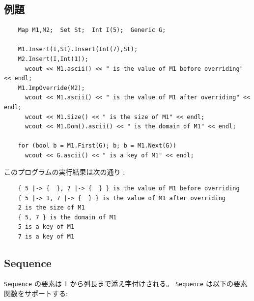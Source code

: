 \documentclass[\pformat,12pt]{jarticle}
\begin{document}
\subsection*{例題}

\begin{verbatim}
    Map M1,M2;  Set St;  Int I(5);  Generic G;

    M1.Insert(I,St).Insert(Int(7),St);
    M2.Insert(I,Int(1));
      wcout << M1.ascii() << " is the value of M1 before overriding" << endl;
    M1.ImpOverride(M2);        
      wcout << M1.ascii() << " is the value of M1 after overriding" << endl;
      wcout << M1.Size() << " is the size of M1" << endl;
      wcout << M1.Dom().ascii() << " is the domain of M1" << endl;
    
    for (bool b = M1.First(G); b; b = M1.Next(G))
      wcout << G.ascii() << " is a key of M1" << endl;
\end{verbatim}

\noindent このプログラムの実行結果は次の通り :

\begin{verbatim}
    { 5 |-> {  }, 7 |-> {  } } is the value of M1 before overriding
    { 5 |-> 1, 7 |-> {  } } is the value of M1 after overriding
    2 is the size of M1
    { 5, 7 } is the domain of M1
    5 is a key of M1
    7 is a key of M1
\end{verbatim}



\subsection{Sequence}

{\tt Sequence} の要素は 1 から列長まで添え字付けされる。 
{\tt Sequence} は以下の要素関数をサポートする:

\vspace{0.5cm}
\end{document}
